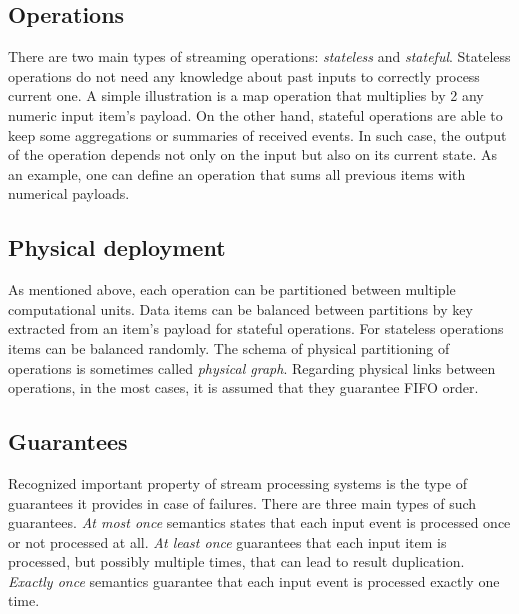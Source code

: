 \subsection{Operations}
There are two main types of streaming operations: {\it stateless} and {\it stateful}. Stateless operations do not need any knowledge about past inputs to correctly process current one. A simple illustration is a map operation that multiplies by 2 any numeric input item's payload. On the other hand, stateful operations are able to keep some aggregations or summaries of received events. In such case, the output of the operation depends not only on the input but also on its current state. As an example, one can define an operation that sums all previous items with numerical payloads.

\subsection{Physical deployment}
As mentioned above, each operation can be partitioned between multiple computational units. Data items can be balanced between partitions by key extracted from an item's payload for stateful operations. For stateless operations items can be balanced randomly. The schema of physical partitioning of operations is sometimes called {\it physical graph}. Regarding physical links between operations, in the most cases, it is assumed that they guarantee FIFO order.

\subsection{Guarantees}
Recognized important property of stream processing systems is the type of guarantees it provides in case of failures. There are three main types of such guarantees. {\it At most once} semantics states that each input event is processed once or not processed at all. {\it At least once} guarantees that each input item is processed, but possibly multiple times, that can lead to result duplication. {\it Exactly once} semantics guarantee that each input event is processed exactly one time.  

